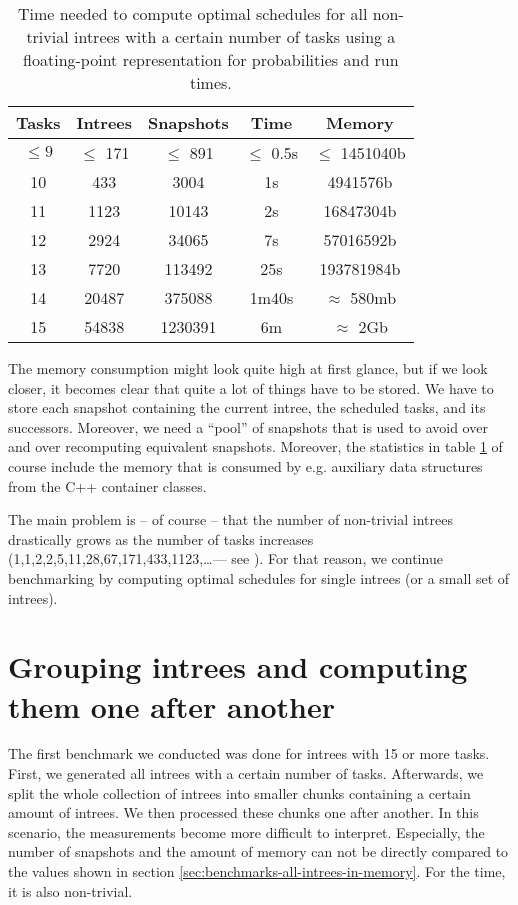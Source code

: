 \begin{table}[ht]
  \centering
  \begin{tabular}[ht]{ccccc}
    Tasks & Intrees & Snapshots & Time & Memory \\
    \hline{}
    $\leq 9$ & $\leq$ 171 & $\leq$ 891 & $\leq$ 0.5s & $\leq$ 1451040b \\
    10 & 433 & 3004 & 1s & 4941576b \\
    11 & 1123 & 10143 & 2s & 16847304b \\
    12 & 2924 & 34065 & 7s & 57016592b \\
    13 & 7720 & 113492 & 25s & 193781984b \\
    14 & 20487 & 375088 & 1m40s & $\approx$ 580mb \\
    15 & 54838 & 1230391 & 6m & $\approx$ 2Gb \\
    
  \end{tabular}
  \caption{Time needed to compute optimal schedules for all non-trivial intrees with a certain number of tasks using a floating-point representation for probabilities and run times.}
  \label{tab:time-benchmark}
\end{table}

The memory consumption might look quite high at first glance, but if we look closer, it becomes clear that quite a lot of things have to be stored. We have to store each snapshot containing the current intree, the scheduled tasks, and its successors. Moreover, we need a ``pool'' of snapshots that is used to avoid over and over recomputing equivalent snapshots. Moreover, the statistics in table \ref{tab:time-benchmark} of course include the memory that is consumed by e.g. auxiliary data structures from the C++ container classes.

The main problem is -- of course -- that the number of non-trivial intrees drastically grows as the number of tasks increases (1,1,2,2,5,11,28,67,171,433,1123,\dots --- see \cite{oeisnumbernontrivialintrees}). For that reason, we continue benchmarking by computing optimal schedules for single intrees (or a small set of intrees).

\section{Grouping intrees and computing them one after another}
\label{sec:benchmarks-clustered-intrees}

The first benchmark we conducted was done for intrees with 15 or more tasks. First, we generated all intrees with a certain number of tasks. Afterwards, we split the whole collection of intrees into smaller chunks containing a certain amount of intrees. We then processed these chunks one after another. In this scenario, the measurements become more difficult to interpret. Especially, the number of snapshots and the amount of memory can not be directly compared to the values shown in section \ref{sec:benchmarks-all-intrees-in-memory}. For the time, it is also non-trivial.

